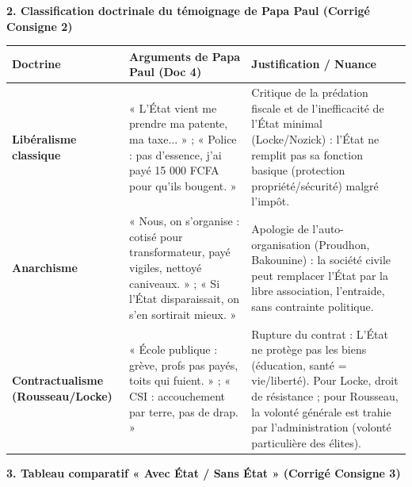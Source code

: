 \documentclass[11pt]{article}
\newcommand{\cle}[1]{{\popxbold\color{popdark}#1}}
\begin{document}
\begin{exoresolu}
\noindent\textbf{2. Classification doctrinale du témoignage de Papa Paul (Corrigé Consigne 2)}

\begin{center}
\begin{tabularx}{\linewidth}{|l|X|X|}\hline
\rowcolor{popblueL}
\textbf{Doctrine} & \textbf{Arguments de Papa Paul (Doc 4)} & \textbf{Justification / Nuance} \\ \hline
\textbf{Libéralisme classique} & « L'État vient me prendre ma patente, ma taxe... » ; « Police : pas d'essence, j'ai payé 15 000 FCFA pour qu'ils bougent. » & Critique de la \cle{prédation fiscale} et de l'\cle{inefficacité} de l'État minimal (Locke/Nozick) : l'État ne remplit pas sa fonction basique (protection propriété/sécurité) malgré l'impôt. \\ \hline
\textbf{Anarchisme} & « Nous, on s'organise : cotisé pour transformateur, payé vigiles, nettoyé caniveaux. » ; « Si l'État disparaissait, on s'en sortirait mieux. » & Apologie de l'\cle{auto-organisation} (Proudhon, Bakounine) : la société civile peut remplacer l'État par la libre association, l'entraide, sans contrainte politique. \\ \hline
\textbf{Contractualisme (Rousseau/Locke)} & « École publique : grève, profs pas payés, toits qui fuient. » ; « CSI : accouchement par terre, pas de drap. » & \cle{Rupture du contrat} : L'État ne protège pas les biens (éducation, santé = vie/liberté). Pour Locke, droit de résistance ; pour Rousseau, la \cle{volonté générale} est trahie par l'administration (volonté particulière des élites). \\ \hline
\end{tabularx}
\end{center}

\noindent\textbf{3. Tableau comparatif « Avec État / Sans État » (Corrigé Consigne 3)}


\end{exoresolu}
\end{document}
